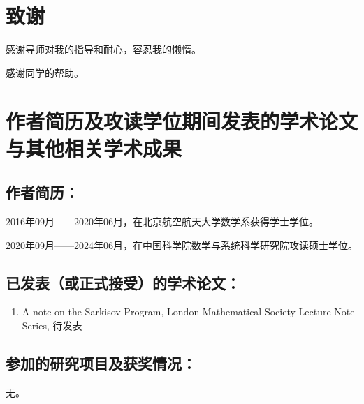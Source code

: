 \chapter[致谢]{致\quad 谢}%

感谢导师对我的指导和耐心，容忍我的懒惰。

感谢同学的帮助。

\chapter{作者简历及攻读学位期间发表的学术论文与其他相关学术成果}

\section*{作者简历：}
2016年09月——2020年06月，在北京航空航天大学数学系获得学士学位。


2020年09月——2024年06月，在中国科学院数学与系统科学研究院攻读硕士学位。


\section*{已发表（或正式接受）的学术论文：}

{
\setlist[enumerate]{}%
\begin{enumerate}[nosep]
    \item A note on the Sarkisov Program, London Mathematical Society Lecture Note Series, 待发表
\end{enumerate}
}


\section*{参加的研究项目及获奖情况：}
无。


\cleardoublepage[plain]%
